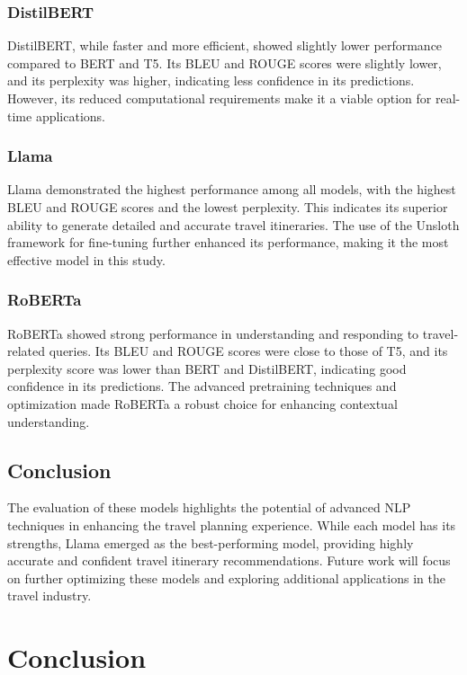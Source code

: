 \documentclass[conference]{IEEEtran}
\begin{document}
\subsubsection{DistilBERT}

DistilBERT, while faster and more efficient, showed slightly lower performance compared to BERT and T5. Its BLEU and ROUGE scores were slightly lower, and its perplexity was higher, indicating less confidence in its predictions. However, its reduced computational requirements make it a viable option for real-time applications.

\subsubsection{Llama}

Llama demonstrated the highest performance among all models, with the highest BLEU and ROUGE scores and the lowest perplexity. This indicates its superior ability to generate detailed and accurate travel itineraries. The use of the Unsloth framework for fine-tuning further enhanced its performance, making it the most effective model in this study.

\subsubsection{RoBERTa}

RoBERTa showed strong performance in understanding and responding to travel-related queries. Its BLEU and ROUGE scores were close to those of T5, and its perplexity score was lower than BERT and DistilBERT, indicating good confidence in its predictions. The advanced pretraining techniques and optimization made RoBERTa a robust choice for enhancing contextual understanding.

\subsection{Conclusion}

The evaluation of these models highlights the potential of advanced NLP techniques in enhancing the travel planning experience. While each model has its strengths, Llama emerged as the best-performing model, providing highly accurate and confident travel itinerary recommendations. Future work will focus on further optimizing these models and exploring additional applications in the travel industry.

\section{Conclusion}
\end{document}
